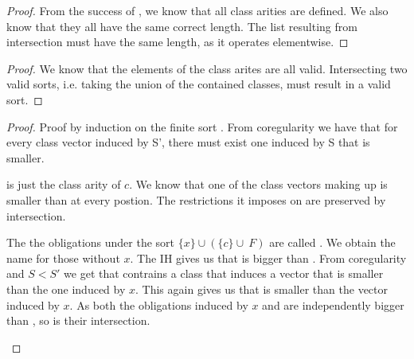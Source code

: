 \begin{lemma}
\end{lemma}
\begin{proof}
    From the success of , we know that all class arities are defined.
    We also know that they all have the same correct length.
    The list resulting from intersection must have the same length, as it operates elementwise.
\end{proof}

\begin{lemma}
\end{lemma}
\begin{proof}
    We know that the elements of the class arites are all valid.
    Intersecting two valid sorts, i.e. taking the union of the contained classes, must result in a valid sort.
\end{proof}

\begin{lemma}
\end{lemma}
\begin{proof}
    Proof by induction on the finite sort .
    From coregularity we have that for every class vector induced by S', there must exist one induced by S that is smaller.
    \begin{description}[]
        \item [\(\{c\}\)]  is just the class arity of \(c\).
            We know that one of the class vectors making up  is smaller than  at every postion.
            The restrictions it imposes on  are preserved by intersection.
        \item [\(\{x\}\cup(\{c\}\cup\ F)\)] The the obligations under the sort \(\{x\}\cup(\{c\}\cup\ F)\) are called .
        We obtain the name  for those without \(x\).
        The IH gives us that  is bigger than .
        From coregularity and \(S < S'\) we get that  contrains a class that induces a vector that is smaller than the one induced by \(x\).
        This again gives us that  is smaller than the vector induced by \(x\).
        As both the obligations induced by \(x\) and  are independently bigger than , so is their intersection.
    \end{description}
\end{proof}


